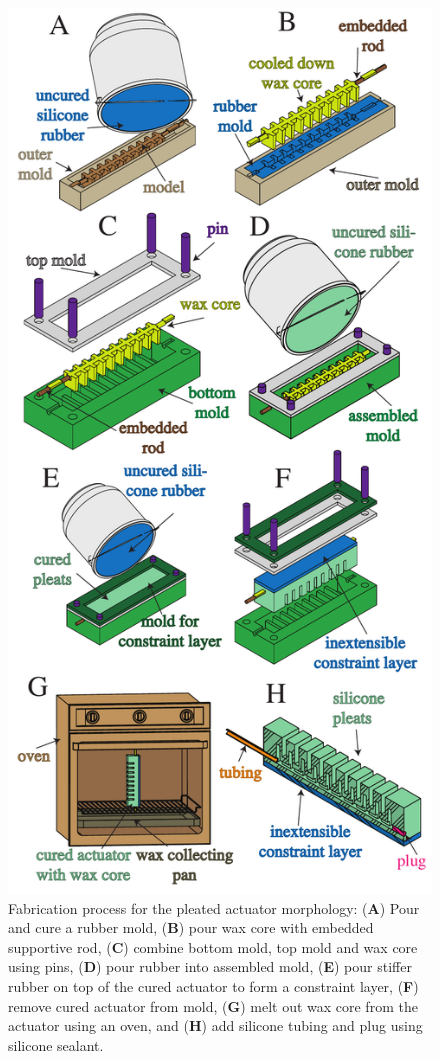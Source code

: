 \begin{figure}[htb]
\centering
   \includegraphics[width=\columnwidth]{figures/fabrication/fab_pleated_process.pdf}
      \caption[Fabrication process for the pleated actuator morphology]{Fabrication process for the pleated actuator morphology: (\textbf{A}) Pour and cure a rubber mold, (\textbf{B}) pour wax core with embedded supportive rod, (\textbf{C}) combine bottom mold, top mold and wax core using pins, (\textbf{D}) pour rubber into assembled mold, (\textbf{E}) pour stiffer rubber on top of the cured actuator to form a constraint layer, (\textbf{F}) remove cured actuator from mold, (\textbf{G}) melt out wax core from the actuator using an oven, and (\textbf{H}) add silicone tubing and plug using silicone sealant.}
      \label{fig:pleated_fab}
\end{figure}

